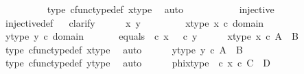 \begin{isabellebody}
\ \ \ \ \ \ \ \ \isamarkupfalse%
\ {\isasymphi}{\isacharunderscore}{\kern0pt}type\ cfunc{\isacharunderscore}{\kern0pt}type{\isacharunderscore}{\kern0pt}def\ x{\isacharunderscore}{\kern0pt}type\ \isamarkupfalse%
\ auto\isanewline
\ \ \ \ \isamarkupfalse%
\isanewline
\ \ \isamarkupfalse%
\isanewline
\isanewline
\ \ \isamarkupfalse%
\ {\isachardoublequoteopen}injective{\isacharparenleft}{\kern0pt}{\isasymphi}{\isacharparenright}{\kern0pt}{\isachardoublequoteclose}\isanewline
\ \ \ \ \isamarkupfalse%
\ injective{\isacharunderscore}{\kern0pt}def\isanewline
\ \ \isamarkupfalse%
{\isacharparenleft}{\kern0pt}clarify{\isacharparenright}{\kern0pt}\isanewline
\ \ \ \ \isamarkupfalse%
\ x\ y\ \ \ \isanewline
\ \ \ \ \isamarkupfalse%
\ x{\isacharunderscore}{\kern0pt}type{\isacharcolon}{\kern0pt}\ {\isachardoublequoteopen}x\ {\isasymin}\isactrlsub c\ domain\ {\isasymphi}{\isachardoublequoteclose}\isanewline
\ \ \ \ \isamarkupfalse%
\ y{\isacharunderscore}{\kern0pt}type{\isacharcolon}{\kern0pt}\ {\isachardoublequoteopen}y\ {\isasymin}\isactrlsub c\ domain\ {\isasymphi}{\isachardoublequoteclose}\isanewline
\ \ \ \ \isamarkupfalse%
\ equals{\isacharcolon}{\kern0pt}\ {\isachardoublequoteopen}{\isasymphi}\ {\isasymcirc}\isactrlsub c\ x\ {\isacharequal}{\kern0pt}\ {\isasymphi}\ {\isasymcirc}\isactrlsub c\ y{\isachardoublequoteclose}\isanewline
\ \ \ \ \isamarkupfalse%
\ x{\isacharunderscore}{\kern0pt}type{}{\isacharcolon}{\kern0pt}\ {\isachardoublequoteopen}x\ {\isasymin}\isactrlsub c\ A\ {\isasymCoprod}\ B{\isachardoublequoteclose}\isanewline
\ \ \ \ \ \ \isamarkupfalse%
\ {\isasymphi}{\isacharunderscore}{\kern0pt}type\ cfunc{\isacharunderscore}{\kern0pt}type{\isacharunderscore}{\kern0pt}def\ x{\isacharunderscore}{\kern0pt}type\ \isamarkupfalse%
\ auto\isanewline
\ \ \ \ \isamarkupfalse%
\ y{\isacharunderscore}{\kern0pt}type{}{\isacharcolon}{\kern0pt}\ {\isachardoublequoteopen}y\ {\isasymin}\isactrlsub c\ A\ {\isasymCoprod}\ B{\isachardoublequoteclose}\isanewline
\ \ \ \ \ \ \isamarkupfalse%
\ {\isasymphi}{\isacharunderscore}{\kern0pt}type\ cfunc{\isacharunderscore}{\kern0pt}type{\isacharunderscore}{\kern0pt}def\ y{\isacharunderscore}{\kern0pt}type\ \isamarkupfalse%
\ auto\isanewline
\isanewline
\ \ \ \ \isamarkupfalse%
\ phix{\isacharunderscore}{\kern0pt}type{\isacharcolon}{\kern0pt}\ {\isachardoublequoteopen}{\isasymphi}\ {\isasymcirc}\isactrlsub c\ x\ {\isasymin}\isactrlsub c\ C\ {\isasymCoprod}\ D{\isachardoublequoteclose}\isanewline

\end{isabellebody}
